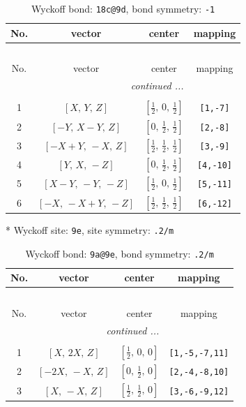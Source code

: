 \documentclass[fleqn,8pt]{jsarticle}
\begin{document}
\renewcommand{\arraystretch}{1.2}
\begin{longtable}{cccc}
\caption{Wyckoff bond: {\tt 18c@9d}, bond symmetry: {\tt -1}}
 \\
 \hline \hline
No. & vector & center & mapping \\ \hline \endfirsthead

\multicolumn{3}{l}{\tablename\ \thetable{}} \\
 \hline \hline
No. & vector & center & mapping \\ \hline \endhead

 \hline \hline
\multicolumn{3}{r}{\footnotesize\it continued ...} \\ \endfoot

 \hline \hline
\multicolumn{3}{r}{} \\ \endlastfoot

1 & $\left[ X,\, Y,\, Z \right]$ & $\left[ \frac{1}{2},\, 0,\, \frac{1}{2} \right]$ & {\tt [1,-7]} \\ \hline
2 & $\left[ - Y,\, X - Y,\, Z \right]$ & $\left[ 0,\, \frac{1}{2},\, \frac{1}{2} \right]$ & {\tt [2,-8]} \\ \hline
3 & $\left[ - X + Y,\, - X,\, Z \right]$ & $\left[ \frac{1}{2},\, \frac{1}{2},\, \frac{1}{2} \right]$ & {\tt [3,-9]} \\ \hline
4 & $\left[ Y,\, X,\, - Z \right]$ & $\left[ 0,\, \frac{1}{2},\, \frac{1}{2} \right]$ & {\tt [4,-10]} \\ \hline
5 & $\left[ X - Y,\, - Y,\, - Z \right]$ & $\left[ \frac{1}{2},\, 0,\, \frac{1}{2} \right]$ & {\tt [5,-11]} \\ \hline
6 & $\left[ - X,\, - X + Y,\, - Z \right]$ & $\left[ \frac{1}{2},\, \frac{1}{2},\, \frac{1}{2} \right]$ & {\tt [6,-12]} \\
\end{longtable}
* Wyckoff site: {\tt 9e}, site symmetry: {\tt .2/m}
\renewcommand{\arraystretch}{1.2}
\begin{longtable}{cccc}
\caption{Wyckoff bond: {\tt 9a@9e}, bond symmetry: {\tt .2/m}}
 \\
 \hline \hline
No. & vector & center & mapping \\ \hline \endfirsthead

\multicolumn{3}{l}{\tablename\ \thetable{}} \\
 \hline \hline
No. & vector & center & mapping \\ \hline \endhead

 \hline \hline
\multicolumn{3}{r}{\footnotesize\it continued ...} \\ \endfoot

 \hline \hline
\multicolumn{3}{r}{} \\ \endlastfoot

1 & $\left[ X,\, 2 X,\, Z \right]$ & $\left[ \frac{1}{2},\, 0,\, 0 \right]$ & {\tt [1,-5,-7,11]} \\ \hline
2 & $\left[ - 2 X,\, - X,\, Z \right]$ & $\left[ 0,\, \frac{1}{2},\, 0 \right]$ & {\tt [2,-4,-8,10]} \\ \hline
3 & $\left[ X,\, - X,\, Z \right]$ & $\left[ \frac{1}{2},\, \frac{1}{2},\, 0 \right]$ & {\tt [3,-6,-9,12]} \\
\end{longtable}
\end{document}
